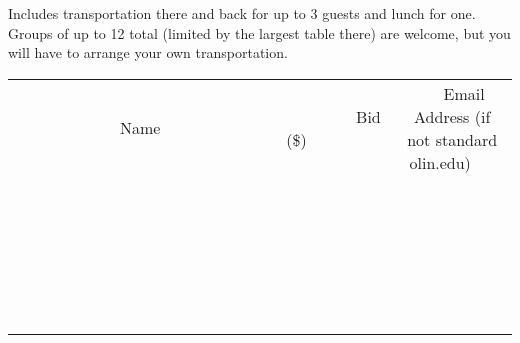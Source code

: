 \documentclass[11pt]{article}
\begin{document}
Includes transportation there and back for up to 3 guests and lunch for one.  Groups of up to 12 total (limited by the largest table there) are welcome, but you will have to arrange your own transportation. \\[6ex]
\begin{tabular}{c c c}
~~~~~~~~~~~~~Name~~~~~~~~~~~~~ & ~~~~~~~~~Bid (\$)~~~~~~~~~ & ~~~Email Address (if not standard olin.edu)~~~ \\
 & & \\
\hline
 & & \\
\hline
 & & \\
\hline
 & & \\
\hline
 & & \\
\hline
 & & \\
\hline
 & & \\
\hline
 & & \\
\hline
 & & \\
\hline
 & & \\
\hline
 & & \\
\hline
 & & \\
\hline
 & & \\
\hline
 & & \\
\hline
 & & \\
\hline
 & & \\
\hline
 & & \\
\hline
 & & \\
\hline
 & & \\
\hline
 & & \\
\hline
 & & \\
\hline
 & & \\
\hline
 & & \\
\hline
 & & \\
\hline
 & & \\
\hline
 & & \\
\hline
\end{tabular}
\clearpage
\end{document}
